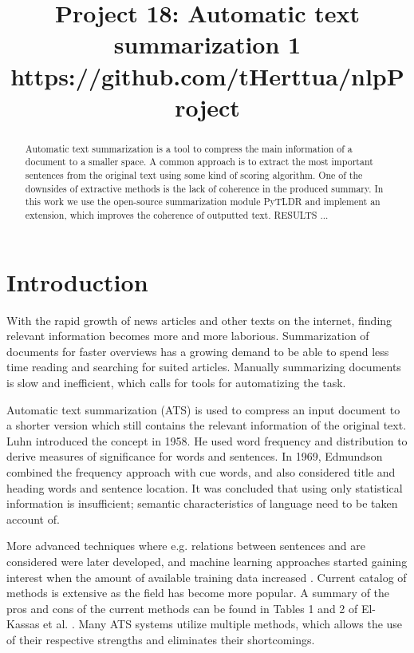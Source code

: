 \documentclass[conference]{IEEEtran}
\begin{document}
\title{Project 18: Automatic text summarization 1\\
{\footnotesize https://github.com/tHerttua/nlpProject
}
}

\author{
	\IEEEauthorblockA{}
\and
{}
\IEEEauthorblockA{}
\and
{}
\IEEEauthorblockA{}
\and
{}
\IEEEauthorblockA{}
}

\maketitle

\begin{abstract}
Automatic text summarization is a tool to compress the main information of a document to a smaller space. A common approach is to extract the most important sentences from the original text using some kind of scoring algorithm. One of the downsides of extractive methods is the lack of coherence in the produced summary. In this work we use the open-source summarization module PyTLDR and implement an extension, which improves the coherence of outputted text. RESULTS ...
\end{abstract}

\section{Introduction}
With the rapid growth of news articles and other texts on the internet, finding relevant information becomes more and more laborious. Summarization of documents for faster overviews has a growing demand to be able to spend less time reading and searching for suited articles. Manually summarizing documents is slow and inefficient, which calls for tools for automatizing the task.

Automatic text summarization (ATS) is used to compress an input document to a shorter version which still contains the relevant information of the original text. Luhn \cite{luhn1958} introduced the concept in 1958. He used word frequency and distribution to derive measures of significance for words and sentences. In 1969, Edmundson \cite{edmundson1969} combined the frequency approach with cue words, and also considered title and heading words and sentence location. It was concluded that using only statistical information is insufficient; semantic characteristics of language need to be taken account of. 

More advanced techniques where e.g. relations between sentences and are considered were later developed, and machine learning approaches started gaining interest when the amount of available training data increased \cite{erkan2004}. 
Current catalog of methods is extensive as the field has become more popular. 
A summary of the pros and cons of the current methods can be found in Tables 1 and 2 of El-Kassas et al. \cite{el-kassas2020}. 
Many ATS systems utilize multiple methods, which allows the use of their respective strengths and eliminates their shortcomings.
\end{document}
